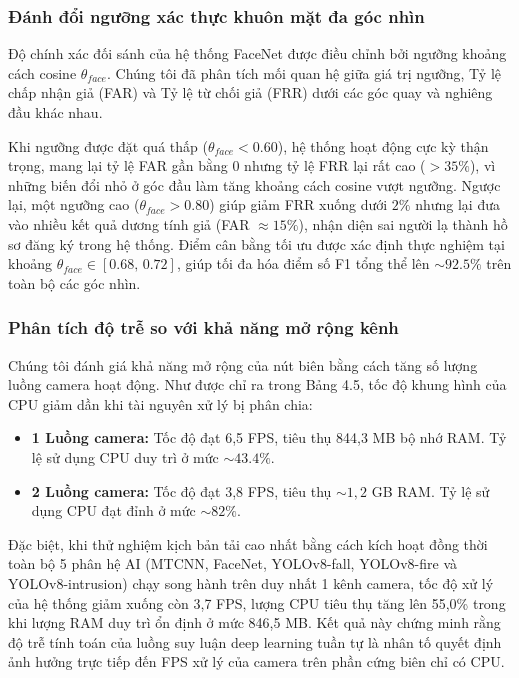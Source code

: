 \documentclass[12pt,a4paper]{article}
\begin{document}
\subsubsection*{Đánh đổi ngưỡng xác thực khuôn mặt đa góc nhìn}
Độ chính xác đối sánh của hệ thống FaceNet được điều chỉnh bởi ngưỡng khoảng cách cosine $\theta_{face}$. Chúng tôi đã phân tích mối quan hệ giữa giá trị ngưỡng, Tỷ lệ chấp nhận giả (FAR) và Tỷ lệ từ chối giả (FRR) dưới các góc quay và nghiêng đầu khác nhau.

Khi ngưỡng được đặt quá thấp ($\theta_{face} < 0.60$), hệ thống hoạt động cực kỳ thận trọng, mang lại tỷ lệ FAR gần bằng 0 nhưng tỷ lệ FRR lại rất cao ($>35\%$), vì những biến đổi nhỏ ở góc đầu làm tăng khoảng cách cosine vượt ngưỡng. Ngược lại, một ngưỡng cao ($\theta_{face} > 0.80$) giúp giảm FRR xuống dưới $2\%$ nhưng lại đưa vào nhiều kết quả dương tính giả (FAR $\approx 15\%$), nhận diện sai người lạ thành hồ sơ đăng ký trong hệ thống. Điểm cân bằng tối ưu được xác định thực nghiệm tại khoảng $\theta_{face} \in [0.68,\, 0.72]$, giúp tối đa hóa điểm số F1 tổng thể lên $\sim 92.5\%$ trên toàn bộ các góc nhìn.

\subsubsection*{Phân tích độ trễ so với khả năng mở rộng kênh}
Chúng tôi đánh giá khả năng mở rộng của nút biên bằng cách tăng số lượng luồng camera hoạt động. Như được chỉ ra trong Bảng 4.5, tốc độ khung hình của CPU giảm dần khi tài nguyên xử lý bị phân chia:
\begin{itemize}
    \item \textbf{1 Luồng camera:} Tốc độ đạt 6,5 FPS, tiêu thụ 844,3 MB bộ nhớ RAM. Tỷ lệ sử dụng CPU duy trì ở mức $\sim 43.4\%$.
    \item \textbf{2 Luồng camera:} Tốc độ đạt 3,8 FPS, tiêu thụ $\sim 1,2$ GB RAM. Tỷ lệ sử dụng CPU đạt đỉnh ở mức $\sim 82\%$.
\end{itemize}
Đặc biệt, khi thử nghiệm kịch bản tải cao nhất bằng cách kích hoạt đồng thời toàn bộ 5 phân hệ AI (MTCNN, FaceNet, YOLOv8-fall, YOLOv8-fire và YOLOv8-intrusion) chạy song hành trên duy nhất 1 kênh camera, tốc độ xử lý của hệ thống giảm xuống còn 3,7 FPS, lượng CPU tiêu thụ tăng lên 55,0\% trong khi lượng RAM duy trì ổn định ở mức 846,5 MB. Kết quả này chứng minh rằng độ trễ tính toán của luồng suy luận deep learning tuần tự là nhân tố quyết định ảnh hưởng trực tiếp đến FPS xử lý của camera trên phần cứng biên chỉ có CPU.
\end{document}
